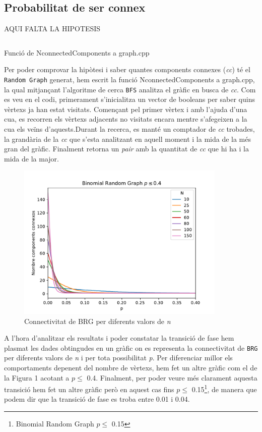 \subsection{Probabilitat de ser connex}
AQUI FALTA LA HIPOTESIS

\begin{listing}
\inputminted[firstline=99,lastline=136]{cpp}{src/graph.cpp}
\caption{Funció de NconnectedComponents a graph.cpp}
\end{listing}

Per poder comprovar la hipòtesi i saber quantes components connexes (\textit{cc}) té el \texttt{Random Graph} generat, hem escrit la funció NconnectedComponents a graph.cpp, la qual mitjançant l'algoritme de cerca \texttt{BFS} analitza el gràfic en busca de \textit{cc}. Com es veu en el codi, primerament s'inicialitza un vector de booleans per saber quins vèrtexs ja han estat visitats. Començant pel primer vèrtex i amb l'ajuda d'una cua, es recorren els vèrtexs adjacents no visitats encara mentre s'afegeixen a la cua els veïns d'aquests.Durant la recerca, es manté un comptador de \textit{cc} trobades, la grandària de la \textit{cc} que s'esta analitzant en aquell moment i la mida de la més gran del gràfic. Finalment retorna un \textit{pair} amb la quantitat de \textit{cc} que hi ha i la mida de la major.

\begin{figure}[H]
    \centering
    \includegraphics[width=10cm]{plots/bin_mult_2_04.pdf}
    \caption{Connectivitat de BRG per diferents valors de \textit{n}}
    \label{fig:connect_04}
\end{figure}

A l'hora d'analitzar els resultats i poder constatar la transició de fase hem plasmat les dades obtingudes en un gràfic on es representa la connectivitat de \texttt{BRG} per diferents valors de \textit{n} i per tota possibilitat \textit{p}. Per diferenciar millor els comportaments depenent del nombre de vèrtexs, hem fet un altre gràfic com el de la Figura 1 acotant a $p\leq$ 0.4. Finalment, per poder veure més clarament aquesta transició hem fet un altre gràfic però en aquest cas fins $p\leq$ 0.15\footnote{Binomial Random Graph $p\leq$ 0.15}, de manera que podem dir que la transició de fase es troba entre 0.01 i 0.04.



